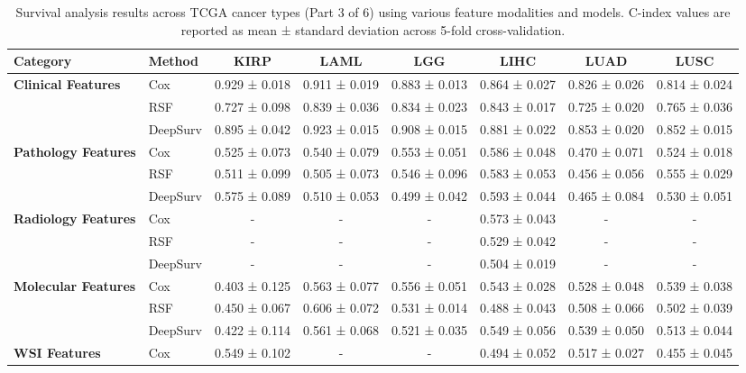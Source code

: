 \begin{sidewaystable}[htbp]
    \centering
    \caption{Survival analysis results across TCGA cancer types (Part 3 of 6) using various feature modalities and models. C-index values are reported as mean ± standard deviation across 5-fold cross-validation.}
    \label{tab:survival_results_3}
    \begin{tabular}{@{}llcccccc@{}}
        \toprule
        \textbf{Category} & \textbf{Method} & \textbf{KIRP} & \textbf{LAML} & \textbf{LGG} & \textbf{LIHC} & \textbf{LUAD} & \textbf{LUSC} \\
        \midrule
        \multirow{3}{*}{\textbf{Clinical Features}} & Cox & 0.929 ± 0.018 & 0.911 ± 0.019 & 0.883 ± 0.013 & 0.864 ± 0.027 & 0.826 ± 0.026 & 0.814 ± 0.024 \\
        & RSF & 0.727 ± 0.098 & 0.839 ± 0.036 & 0.834 ± 0.023 & 0.843 ± 0.017 & 0.725 ± 0.020 & 0.765 ± 0.036 \\
        & DeepSurv & 0.895 ± 0.042 & 0.923 ± 0.015 & 0.908 ± 0.015 & 0.881 ± 0.022 & 0.853 ± 0.020 & 0.852 ± 0.015 \\
        \midrule
        \multirow{3}{*}{\textbf{Pathology Features}} & Cox & 0.525 ± 0.073 & 0.540 ± 0.079 & 0.553 ± 0.051 & 0.586 ± 0.048 & 0.470 ± 0.071 & 0.524 ± 0.018 \\
        & RSF & 0.511 ± 0.099 & 0.505 ± 0.073 & 0.546 ± 0.096 & 0.583 ± 0.053 & 0.456 ± 0.056 & 0.555 ± 0.029 \\
        & DeepSurv & 0.575 ± 0.089 & 0.510 ± 0.053 & 0.499 ± 0.042 & 0.593 ± 0.044 & 0.465 ± 0.084 & 0.530 ± 0.051 \\
        \midrule
        \multirow{3}{*}{\textbf{Radiology Features}} & Cox & - & - & - & 0.573 ± 0.043 & - & - \\
        & RSF & - & - & - & 0.529 ± 0.042 & - & - \\
        & DeepSurv & - & - & - & 0.504 ± 0.019 & - & - \\
        \midrule
        \multirow{3}{*}{\textbf{Molecular Features}} & Cox & 0.403 ± 0.125 & 0.563 ± 0.077 & 0.556 ± 0.051 & 0.543 ± 0.028 & 0.528 ± 0.048 & 0.539 ± 0.038 \\
        & RSF & 0.450 ± 0.067 & 0.606 ± 0.072 & 0.531 ± 0.014 & 0.488 ± 0.043 & 0.508 ± 0.066 & 0.502 ± 0.039 \\
        & DeepSurv & 0.422 ± 0.114 & 0.561 ± 0.068 & 0.521 ± 0.035 & 0.549 ± 0.056 & 0.539 ± 0.050 & 0.513 ± 0.044 \\
        \midrule
        \multirow{3}{*}{\textbf{WSI Features}} & Cox & 0.549 ± 0.102 & - & - & 0.494 ± 0.052 & 0.517 ± 0.027 & 0.455 ± 0.045 \\

\end{tabular}
\end{sidewaystable}

